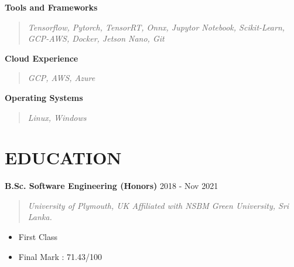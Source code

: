 \documentclass[mm]{./assets/res} %
\begin{document}
\begin{resume}
\textbf{Tools and Frameworks}
\begin{quote}
	\emph{Tensorflow, Pytorch, TensorRT, Onnx, Jupytor Notebook, Scikit-Learn, GCP-AWS, Docker, Jetson Nano, Git}
	\end{quote}

\textbf{Cloud Experience}
	\begin{quote}
		\emph{GCP, AWS, Azure}
		\end{quote}

\textbf{Operating Systems}
\begin{quote}
	\emph{Linux, Windows}
	\end{quote} 



\section{EDUCATION}


\textbf{B.Sc. Software Engineering (Honors)} \hfill 2018 - Nov 2021
\begin{quote}
\emph{University of Plymouth, UK Affiliated with NSBM Green University, Sri Lanka.}
\end{quote}

\begin{itemize} \itemsep -1pt %
\item First Class
\item Final Mark : 71.43/100
\end{itemize}

%


\end{resume}
\end{document}
